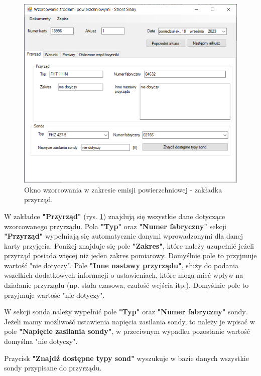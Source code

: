 	\begin{figure}[htb]
		\centering
		\includegraphics[width=\columnwidth]{obrazki/Wzorcowanie/emisja/przyrzad.png}
		\caption{Okno wzorcowania w zakresie emisji powierzchniowej - zakładka przyrząd.}
		\label{emisjaPrzyrzad}
	\end{figure}
	
	W zakładce \textbf{"Przyrząd"} (rys. \ref{emisjaPrzyrzad}) znajdują się wszystkie dane dotyczące wzorcowanego przyrządu. Pola \textbf{"Typ"} oraz \textbf{"Numer fabryczny"} sekcji \textbf{"Przyrząd"} wypełniają się automatycznie danymi wprowadzonymi dla danej karty przyjęcia. Poniżej znajduje się pole \textbf{"Zakres"}, które należy uzupełnić jeżeli przyrząd posiada więcej niż jeden zakres pomiarowy. Domyślnie pole to przyjmuje wartość "nie dotyczy". Pole \textbf{"Inne nastawy przyrządu"}, służy do podania wszelkich dodatkowych informacji o ustawieniach, które mogą mieć wpływ na działanie przyrządu (np. stała czasowa, czułość wejścia itp.). Domyślnie pole to przyjmuje wartość "nie dotyczy".
	
	W sekcji sonda należy wypełnić pole \textbf{"Typ"} oraz \textbf{"Numer fabryczny"} sondy. Jeżeli mamy możliwość ustawienia napięcia zasilania sondy, to należy je wpisać w pole \textbf{"Napięcie zasilania sondy"}, w przeciwnym wypadku pozostanie wartość domyślna "nie dotyczy".
	
	Przycisk \textbf{"Znajdź dostępne typy sond"} wyszukuje w bazie danych wszystkie sondy przypisane do przyrządu.
	
